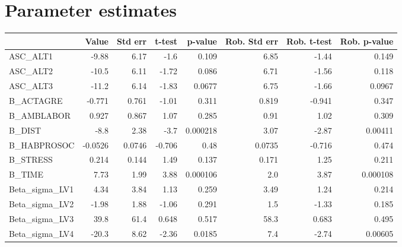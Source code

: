 \section{Parameter estimates}
\begin{tabular}{lrrrrrrr}
\toprule
{} &   Value &  Std err &  t-test &  p-value &  Rob. Std err &  Rob. t-test &  Rob. p-value \\
\midrule
ASC\_ALT1       &   -9.88 &     6.17 &    -1.6 &    0.109 &          6.85 &        -1.44 &         0.149 \\
ASC\_ALT2       &   -10.5 &     6.11 &   -1.72 &    0.086 &          6.71 &        -1.56 &         0.118 \\
ASC\_ALT3       &   -11.2 &     6.14 &   -1.83 &   0.0677 &          6.75 &        -1.66 &        0.0967 \\
B\_ACTAGRE      &  -0.771 &    0.761 &   -1.01 &    0.311 &         0.819 &       -0.941 &         0.347 \\
B\_AMBLABOR     &   0.927 &    0.867 &    1.07 &    0.285 &          0.91 &         1.02 &         0.309 \\
B\_DIST         &    -8.8 &     2.38 &    -3.7 & 0.000218 &          3.07 &        -2.87 &       0.00411 \\
B\_HABPROSOC    & -0.0526 &   0.0746 &  -0.706 &     0.48 &        0.0735 &       -0.716 &         0.474 \\
B\_STRESS       &   0.214 &    0.144 &    1.49 &    0.137 &         0.171 &         1.25 &         0.211 \\
B\_TIME         &    7.73 &     1.99 &    3.88 & 0.000106 &           2.0 &         3.87 &      0.000108 \\
Beta\_sigma\_LV1 &    4.34 &     3.84 &    1.13 &    0.259 &          3.49 &         1.24 &         0.214 \\
Beta\_sigma\_LV2 &   -1.98 &     1.88 &   -1.06 &    0.291 &           1.5 &        -1.33 &         0.185 \\
Beta\_sigma\_LV3 &    39.8 &     61.4 &   0.648 &    0.517 &          58.3 &        0.683 &         0.495 \\
Beta\_sigma\_LV4 &   -20.3 &     8.62 &   -2.36 &   0.0185 &           7.4 &        -2.74 &       0.00605 \\
\bottomrule
\end{tabular}

